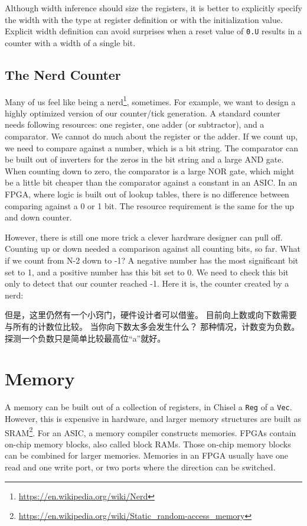\documentclass[%
    10pt,
    headinclude, footexclude,
    openright, %
    notitlepage,
    cleardoubleempty,
    headsepline,
    pointlessnumbers,
    bibtotoc, idxtotoc,
    ]{scrbook}
\newcommand{\code}[1]{{\small{\texttt{#1}}}}
\newcommand{\myref}[2]{\href{#1}{#2}}
\renewcommand{\myref}[2]{{#2}{\footnote{\url{#1}}}}
\begin{document}
Although width inference should size the registers, it is better to explicitly
specify the width with the type at register definition or with the
initialization value. Explicit width definition can avoid surprises when a reset value of \code{0.U}
results in a counter with a width of a single bit.

\subsection{The Nerd Counter}

Many of us feel like being a \myref{https://en.wikipedia.org/wiki/Nerd}{nerd}, sometimes.
For example, we want to design a highly optimized version of our counter/tick generation.
A standard counter needs following resources: one register, one adder (or subtractor),
and a comparator. We cannot do much about the register or the adder. If we count
up, we need to compare against a number, which is a bit string. The comparator
can be built out of inverters for the zeros in the bit string and a large AND gate.
When counting down to zero, the comparator is a large NOR gate, which might be
a little bit cheaper than the comparator against a constant in an ASIC.
In an FPGA, where logic is built out of lookup tables, there is no difference between comparing
against a 0 or 1 bit. The resource requirement is the same for the up and down counter.

However, there is still one more trick a clever hardware designer can pull off.
Counting up or down needed a comparison against all counting bits, so far.
What if we count from N-2 down to -1? A negative number has the most significant bit
set to 1, and a positive number has this bit set to 0. We need to check this bit only to detect
that our counter reached -1. Here it is, the counter created by a nerd:

但是，这里仍然有一个小窍门，硬件设计者可以借鉴。
目前向上数或向下数需要与所有的计数位比较。
当你向下数太多会发生什么？
那种情况，计数变为负数。探测一个负数只是简单比较最高位“a”就好。


\section{Memory}

A memory can be built out of a collection of registers, in Chisel a \code{Reg} of a \code{Vec}.
However, this is expensive in hardware, and larger memory structures are built
as \myref{https://en.wikipedia.org/wiki/Static_random-access_memory}{SRAM}.
For an ASIC, a memory compiler constructs memories.
FPGAs contain on-chip memory blocks, also called block RAMs.
Those on-chip memory blocks can be combined for larger memories.
Memories in an FPGA usually have one read and one write port, or
two ports where the direction can be switched.
\end{document}
